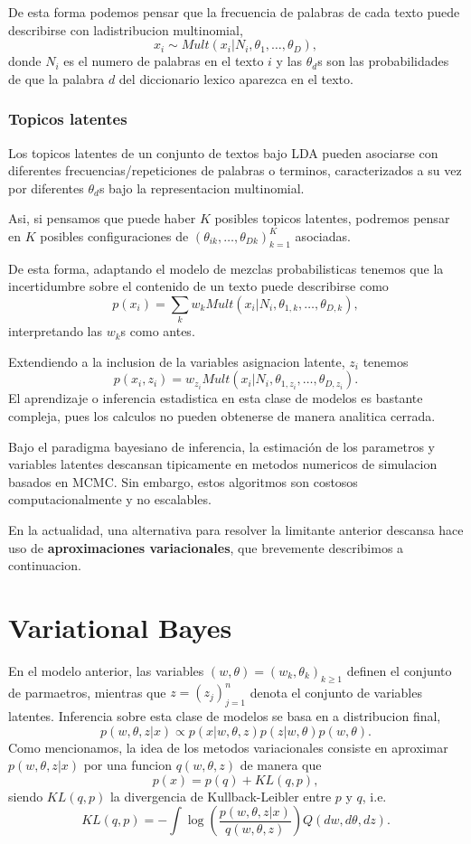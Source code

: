 \documentclass[11pt,]{article}
\begin{document}
De esta forma podemos pensar que la frecuencia de palabras de cada texto
puede describirse con ladistribucion multinomial, \[
x_i \sim Mult(x_i|N_i,\theta_1,\ldots,\theta_D),
\] donde \(N_i\) es el numero de palabras en el texto \(i\) y las
\(\theta_d\)s son las probabilidades de que la palabra \(d\) del
diccionario lexico aparezca en el texto.

\subsubsection{Topicos latentes}\label{topicos-latentes}

Los topicos latentes de un conjunto de textos bajo LDA pueden asociarse
con diferentes frecuencias/repeticiones de palabras o terminos,
caracterizados a su vez por diferentes \(\theta_d\)s bajo la
representacion multinomial.

Asi, si pensamos que puede haber \(K\) posibles topicos latentes,
podremos pensar en \(K\) posibles configuraciones de
\((\theta_{ik},\ldots,\theta_{Dk})_{k=1}^{K}\) asociadas.

De esta forma, adaptando el modelo de mezclas probabilisticas tenemos
que la incertidumbre sobre el contenido de un texto puede describirse
como \[
p(x_i)=\sum_{k} w_k Mult(x_i|N_i,\theta_{1,k},\ldots,\theta_{D,k}),
\] interpretando las \(w_k\)s como antes.

Extendiendo a la inclusion de la variables asignacion latente, \(z_i\)
tenemos \[
p(x_i,z_i)=w_{z_i} Mult(x_i|N_i,\theta_{1,z_i},\ldots,\theta_{D,z_i}).
\] El aprendizaje o inferencia estadistica en esta clase de modelos es
bastante compleja, pues los calculos no pueden obtenerse de manera
analitica cerrada.

Bajo el paradigma bayesiano de inferencia, la estimación de los
parametros y variables latentes descansan tipicamente en metodos
numericos de simulacion basados en MCMC. Sin embargo, estos algoritmos
son costosos computacionalmente y no escalables.

En la actualidad, una alternativa para resolver la limitante anterior
descansa hace uso de \textbf{aproximaciones variacionales}, que
brevemente describimos a continuacion.

\section{Variational Bayes}\label{variational-bayes}

En el modelo anterior, las variables
\((w,\theta)=(w_k,\theta_k)_{k\geq 1}\) definen el conjunto de
parmaetros, mientras que \(z=(z_j)_{j=1}^{n}\) denota el conjunto de
variables latentes. Inferencia sobre esta clase de modelos se basa en a
distribucion final, \[
p(w,\theta,z|x)\propto p(x|w,\theta,z)p(z|w,\theta) p(w,\theta).
\] Como mencionamos, la idea de los metodos variacionales consiste en
aproximar \(p(w,\theta,z|x)\) por una funcion \(q(w,\theta,z)\) de
manera que \[
p(x) = p(q) + KL(q,p),
\] siendo \(KL(q,p)\) la divergencia de Kullback-Leibler entre \(p\) y
\(q\), i.e. \[
KL(q,p) = -\int \log\left(\frac{p(w,\theta,z|x)}{q(w,\theta,z)}\right)Q(d w,d \theta,d z).
\]
\end{document}
